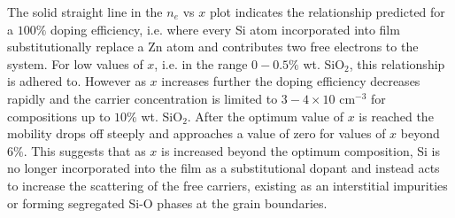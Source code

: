 \documentclass[final,5p,times]{elsarticle}
\begin{document}
The solid straight line in the $n_e$ vs $x$ plot indicates the relationship predicted for  a $100\%$ doping efficiency, i.e. where every Si atom incorporated into film substitutionally replace a Zn atom and contributes two free electrons to the system. For low values of $x$, i.e. in the range $0 - 0.5\%$ wt. SiO$_{2}$, this relationship is adhered to. However as $x$ increases further the doping efficiency decreases rapidly and the carrier concentration is limited to $3-4\times10$ cm$^{-3}$ for compositions up to $10\%$ wt. SiO$_{2}$. After the optimum value of $x$ is reached the mobility drops off steeply and approaches a value of zero for values of $x$ beyond $6\%$. This suggests that as $x$ is increased beyond the optimum composition, Si is no longer incorporated into the film as a substitutional dopant and instead acts to increase the scattering of the free carriers, existing as an interstitial impurities or forming segregated Si-O phases at the grain boundaries.
\end{document}
